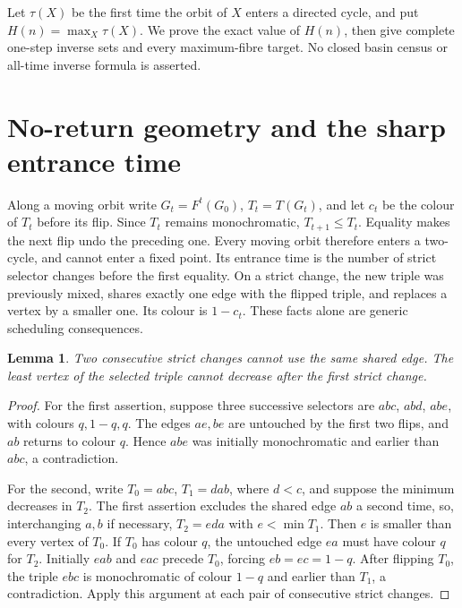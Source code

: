 \documentclass[a4paper,10pt]{amsart}
\newtheorem{lemma}[theorem]{Lemma}
\theoremstyle{remark}
\begin{document}
Let $\tau(X)$ be the first time the orbit of $X$ enters a directed cycle,
and put $H(n)=\max_X\tau(X)$. We prove the exact value of $H(n)$, then
give complete one-step inverse sets and every maximum-fibre target. No
closed basin census or all-time inverse formula is asserted.

\section{No-return geometry and the sharp entrance time}

Along a moving orbit write $G_t=F^t(G_0)$, $T_t=T(G_t)$, and let $c_t$
be the colour of $T_t$ before its flip. Since $T_t$ remains monochromatic,
$T_{t+1}\le T_t$. Equality makes the next flip undo the preceding one.
Every moving orbit therefore enters a two-cycle, and cannot enter a fixed
point. Its entrance time is the number of strict selector changes before
the first equality. On a strict change, the new triple was previously
mixed, shares exactly one edge with the flipped triple, and replaces a
vertex by a smaller one. Its colour is $1-c_t$. These facts alone are
generic scheduling consequences.

\begin{lemma}\label{lem:obstructions}
Two consecutive strict changes cannot use the same shared edge. The least
vertex of the selected triple cannot decrease after the first strict change.
\end{lemma}
\begin{proof}
For the first assertion, suppose three successive selectors are $abc$,
$abd$, $abe$, with colours $q,1-q,q$. The edges $ae,be$ are untouched by
the first two flips, and $ab$ returns to colour $q$. Hence $abe$ was
initially monochromatic and earlier than $abc$, a contradiction.

For the second, write $T_0=abc$, $T_1=dab$, where $d<c$, and suppose
the minimum decreases in $T_2$. The first assertion excludes the shared
edge $ab$ a second time, so, interchanging $a,b$ if necessary,
$T_2=eda$ with $e<\min T_1$. Then $e$ is smaller than every vertex of
$T_0$. If $T_0$ has colour $q$, the untouched edge $ea$ must have colour
$q$ for $T_2$. Initially $eab$ and $eac$ precede $T_0$, forcing
$eb=ec=1-q$. After flipping $T_0$, the triple $ebc$ is monochromatic
of colour $1-q$ and earlier than $T_1$, a contradiction. Apply this
argument at each pair of consecutive strict changes.
\end{proof}
\end{document}
